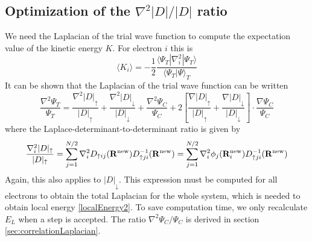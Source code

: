 \documentclass[english, a4paper]{article}
\begin{document}
\subsection{Optimization of the $\nabla^2 |D| / |D|$ ratio}
We need the Laplacian of the trial wave function to compute the expectation value of the kinetic
energy $K$. For electron $i$ this is
\begin{equation}
 \langle K_i \rangle = -\frac{1}{2} \frac{\langle\Psi_T|\nabla_i^2|\Psi_T\rangle}{\langle\Psi_T|\Psi\rangle_T}
 \label{kineticEnergy}
\end{equation}
It can be shown that the Laplacian of the trial wave function can be written
\begin{equation}
 \frac{\nabla^2\Psi_T}{\Psi_T} = \frac{\nabla^2|D|_\uparrow}{|D|_\uparrow} + 
 \frac{\nabla^2|D|_\downarrow}{|D|_\downarrow} + \frac{\nabla^2\Psi_C}{\Psi_C} + 
 2\left[\frac{\nabla|D|_\uparrow}{|D|_\uparrow} + \frac{\nabla|D|_\downarrow}{|D|_\downarrow}\right]
 \cdot \frac{\nabla \Psi_C}{\Psi_C}
\end{equation}
where the Laplace-determinant-to-determinant ratio is given by
\begin{equation}
 \frac{\nabla_i^2|D|_{\uparrow}}{|D|_{\uparrow}} = \sum_{j=1}^{N/2}\nabla_i^2D_{\uparrow ij}({\bf R}^{\textrm{new}})
 D_{\uparrow ji}^{-1}({\bf R}^{\textrm{new}})
 = \sum_{j=1}^{N/2}\nabla_i^2\phi_j({\bf R}_i^{\textrm{new}})D_{\uparrow ji}^{-1}({\bf R}^{\textrm{new}})
\end{equation}
Again, this also applies to $|D|_\downarrow$. 
This expression must be computed for all electrons to obtain the total Laplacian for the whole system, which is needed
to obtain local energy \eqref{localEnergy2}. To save computation time, we only recalculate $E_L$ when
a step is accepted. The ratio $\nabla^2 \Psi_C / \Psi_C$ is derived in section \ref{sec:correlationLaplacian}.
\end{document}
